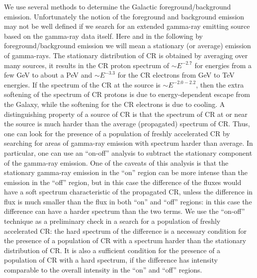 We use several methods to determine the Galactic foreground/background emission.
Unfortunately the notion of the foreground and background emission may not be well defined if we search for
an extended gamma-ray emitting source based on the gamma-ray data itself.
Here and in the following by foreground/background emission we will mean a stationary (or average) emission of gamma-rays.
The stationary distribution of CR is obtained by averaging over many sources, it results in the CR proton spectrum
of $\sim E^{-2.7}$ for energies from a few GeV to about a PeV and $\sim E^{-3.3}$ for the CR electrons from GeV to TeV energies.
If the spectrum of the CR at the source is $\sim E^{-2.0 - 2.2}$, then the extra softening of the spectrum of CR protons is due to energy-dependent escape
from the Galaxy,
while the softening for the CR electrons is due to cooling.
A distinguishing property of a source of CR is that the spectrum of CR at or near the source is much harder than the average (propagated)
spectrum of CR.
Thus, one can look for the presence of a population of freshly accelerated CR by searching for areas of gamma-ray emission
with spectrum harder than average. In particular, one can use an ``on-off'' analysis to subtract the stationary component of the gamma-ray emission.
One of the caveats of this analysis is that the stationary gamma-ray emission in the ``on'' region can be more intense than the emission in the ``off'' region,
but in this case the difference of the fluxes would have a soft spectrum characteristic of the propagated CR,
unless the difference in flux is much smaller than the flux in both ``on'' and  ``off''  regions: in this case the difference can have a harder spectrum than the two terms.
We use the ``on-off'' technique as a preliminary check in a search for a population of freshly accelerated CR:
the hard spectrum of the difference is a necessary condition for the presence of a population of CR with a spectrum harder than the stationary distribution of CR.
It is also a sufficient condition for the presence of a population of CR with a hard spectrum, if the difference
has intensity comparable to the overall intensity in the ``on'' and  ``off''  regions.


